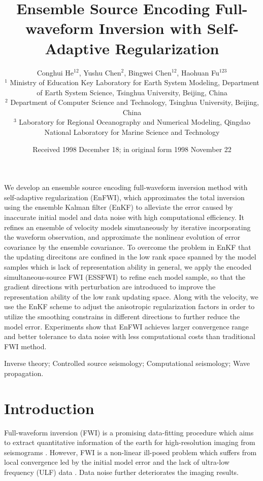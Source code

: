\documentclass[mreferee]{gji}
\title[Geophys.\ J.\ Int.: \LaTeXe\ Guide for Authors]
	{Ensemble Source Encoding Full-waveform Inversion with Self-Adaptive Regularization}
\author[C. He]
  {Conghui He$^{12}$, Yushu Chen$^2$, Bingwei Chen$^{12}$, Haohuan Fu$^{123}$ \\
  $^1$ Ministry of Education Key Laboratory for Earth System Modeling, Department of Earth System Science, Tsinghua University, Beijing, China \\
  $^2$ Department of Computer Science and Technology, Tsinghua University, Beijing, China \\
  $^3$ Laboratory for Regional Oceanography and Numerical Modeling, Qingdao National Laboratory for Marine Science and Technology
  }
\date{Received 1998 December 18; in original form 1998 November 22}
\begin{document}
\label{firstpage}

\maketitle


\begin{summary}
We develop an ensemble source encoding full-waveform inversion method with self-adaptive regularization (EnFWI), which approximates the total inversion using the ensemble Kalman filter (EnKF) to alleviate the error caused by inaccurate initial model and data noise with high computational efficiency. It refines an ensemble of velocity models simutaneously by iterative incorporating the waveform observation, and approximate the nonlinear evolution of error covariance by the ensemble covariance. To overcome the problem in EnKF that the updating direcitons are confined in the low rank space spanned by the model samples which is lack of representation ability in general, we apply the encoded simultaneous-source FWI (ESSFWI) to refine each model sample, so that the gradient directions with perturbation are introduced to improve the representation ability of the low rank updating space. Along with the velocity, we use the EnKF scheme to adjust the anisotropic regularization factors in order to utilize the smoothing constrains in different directions to further reduce the model error. Experiments show that EnFWI achieves larger convergence range and better tolerance to data noise with less computational costs than traditional FWI method.
\end{summary}

\begin{keywords}
Inverse theory; Controlled source seismology; Computational seismology; Wave propagation.
\end{keywords}

\section{Introduction}

Full-waveform inversion (FWI) is a promising data-fitting procedure which aims to extract quantitative information of the earth for high-resolution imaging from seismograms \cite{ta84}. However, FWI is a non-linear ill-posed problem which suffers from local convergence led by the initial model error and the lack of ultra-low frequency (ULF) data \cite{vi}. Data noise further deteriorates the imaging results.
\end{document}
